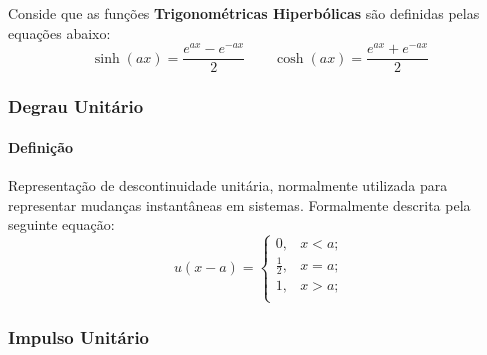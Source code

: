 \documentclass{article}
\begin{document}
        Conside que as funções \textbf{Trigonométricas Hiperbólicas} são definidas pelas equações abaixo:
            \begin{equation}
                \boxed{
                    \sinh(ax) = \frac{e^{ax} - e^{-ax}}{2}
                }
                \qquad
                \boxed{
                    \cosh(ax) = \frac{e^{ax} + e^{-ax}}{2}
                }
            \end{equation}

        \subsubsection{Degrau Unitário}
            \paragraph{Definição}Representação de descontinuidade unitária, normalmente utilizada para representar mudanças instantâneas em sistemas. Formalmente descrita pela seguinte equação:
                \begin{equation}
                    \boxed{
                        u(x - a) = 
                        \begin{cases}
                            0, & x < a;\\
                            \frac{1}{2}, & x = a;\\
                            1, & x > a;\\
                        \end{cases}
                    }
                \end{equation}

        \subsubsection{Impulso Unitário}
\end{document}
